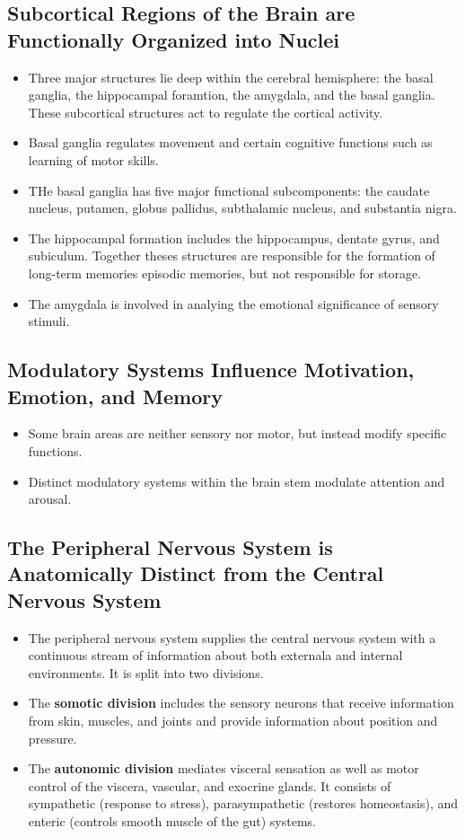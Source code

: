\documentclass[12pt,a4paper]{article}
\begin{document}
\subsection{Subcortical Regions of the Brain are Functionally Organized into Nuclei}
\begin{itemize}
    \item Three major structures lie deep within the cerebral hemisphere: the basal ganglia, the hippocampal foramtion, the amygdala, and the basal ganglia. These subcortical structures act to regulate the cortical activity. 
    \item Basal ganglia regulates movement and certain cognitive functions such as learning of motor skills.
    \item THe basal ganglia has five major functional subcomponents: the caudate nucleus, putamen, globus pallidus, subthalamic nucleus, and substantia nigra.
    \item The hippocampal formation includes the hippocampus, dentate gyrus, and subiculum. Together theses structures are responsible for the formation of long-term memories episodic memories, but not responsible for storage.
    \item The amygdala is involved in analying the emotional significance of sensory stimuli.
\end{itemize}

\subsection{Modulatory Systems Influence Motivation, Emotion, and Memory}
\begin{itemize}
    \item Some brain areas are neither sensory nor motor, but instead modify specific functions.
    \item Distinct modulatory systems within the brain stem modulate attention and arousal. 
\end{itemize}

\subsection{The Peripheral Nervous System is Anatomically Distinct from the Central Nervous System}
\begin{itemize}
    \item The peripheral nervous system supplies the central nervous system with a continuous stream of information about both externala and internal environments. It is split into two divisions.
    \item The \textbf{somotic division} includes the sensory neurons that receive information from skin, muscles, and joints and provide information about position and pressure. 
    \item The \textbf{autonomic division} mediates visceral sensation as well as motor control of the viscera, vascular, and exocrine glands. It consists of sympathetic (response to stress), parasympathetic (restores homeostasis), and enteric (controls smooth muscle of the gut) systems.
\end{itemize}
\end{document}
